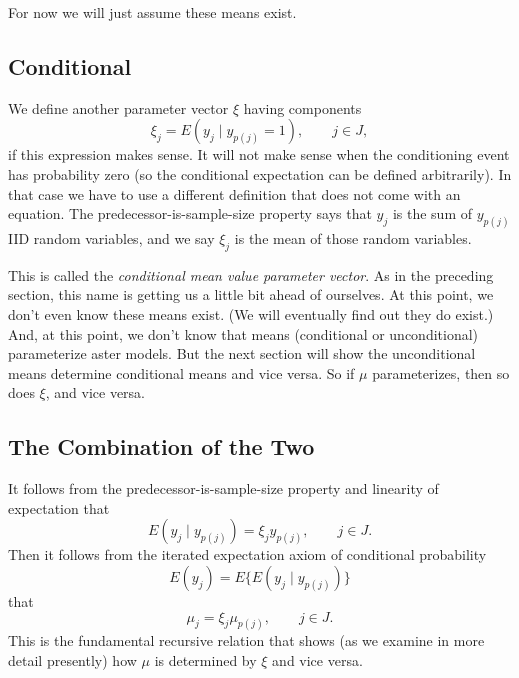 For now we will just assume these means exist.

\subsection{Conditional}

We define another parameter vector $\xi$ having components
$$
   \xi_j = E(y_j \mid y_{p(j)} = 1), \qquad j \in J,
$$
if this expression makes sense.  It will not make sense when the
conditioning event has probability zero (so the conditional expectation
can be defined arbitrarily).  In that case we have to use a different
definition that does not come with an equation.
The predecessor-is-sample-size property says that $y_j$ is the sum
of $y_{p(j)}$ IID random variables, and we say $\xi_j$ is the mean
of those random variables.

This is called the \emph{conditional mean value parameter vector}.
As in the preceding section, this name is getting us a little bit ahead
of ourselves.
At this point, we don't even know these means exist.
(We will eventually find out they do exist.)
And, at this point, we don't know that means (conditional or unconditional)
parameterize aster models.  But the next section will show the unconditional
means determine conditional means and vice versa.  So if $\mu$ parameterizes,
then so does $\xi$, and vice versa.

\subsection{The Combination of the Two}
\label{sec:mu-and-xi}

It follows from the predecessor-is-sample-size property and linearity of
expectation that
\begin{equation} \label{eq:cond-exp}
   E(y_j \mid y_{p(j)}) = \xi_j y_{p(j)}, \qquad j \in J.
\end{equation}
Then it follows from the iterated expectation axiom of conditional probability
$$
   E(y_j)
   =
   E\{E(y_j \mid y_{p(j)})\}
$$
that
\begin{equation} \label{eq:mu-and-xi}
   \mu_j = \xi_j \mu_{p(j)}, \qquad j \in J.
\end{equation}
This is the fundamental recursive relation that shows (as we examine in
more detail presently) how $\mu$ is determined by $\xi$ and vice versa.

